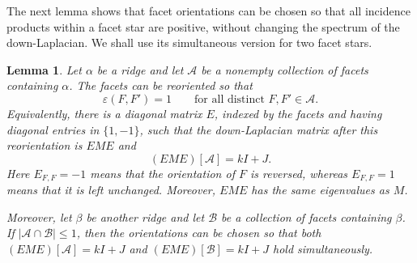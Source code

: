 \documentclass[11pt,reqno]{amsart}
\numberwithin{equation}{section}
\theoremstyle{plain}
\newtheorem{lemma}[theorem]{Lemma}
\theoremstyle{definition}
\newcommand{\eps}{\varepsilon}
\newcommand{\Aset}{\mathcal A}
\newcommand{\Bset}{\mathcal B}
\begin{document}
The next lemma shows that facet orientations can be chosen so that all incidence products
within a facet star are positive, without changing the spectrum of the down-Laplacian. We shall
use its simultaneous version for two facet stars.

\begin{lemma}\label{lem:switch}
Let $\alpha$ be a ridge and let $\Aset$ be a nonempty collection of facets containing
$\alpha$. The facets can be reoriented so that
\[
  \eps(F,F')=1\qquad\text{for all distinct }F,F'\in\Aset.
\]
Equivalently, there is a diagonal matrix $E$, indexed by the facets and having diagonal entries
in $\{1,-1\}$, such that the down-Laplacian matrix after this reorientation is $EME$ and
\[
  (EME)[\Aset]=kI+J .
\]
Here $E_{F,F}=-1$ means that the orientation of $F$ is reversed, whereas $E_{F,F}=1$ means that
it is left unchanged. Moreover, $EME$ has the same eigenvalues as $M$.

Moreover, let $\beta$ be another ridge and let $\Bset$ be a collection of facets containing
$\beta$. If $|\Aset\cap\Bset|\le1$, then the orientations can be chosen so that both
$(EME)[\Aset]=kI+J$ and $(EME)[\Bset]=kI+J$ hold simultaneously.
\end{lemma}
\end{document}
